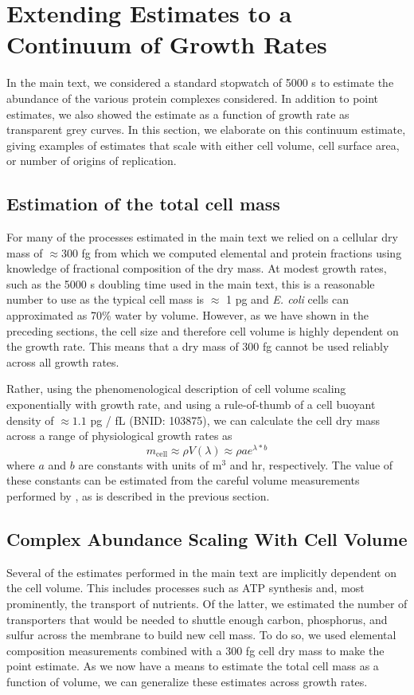 \section{Extending Estimates to a Continuum of Growth Rates}
In the main text, we considered a standard stopwatch of 5000 s to estimate the
abundance of the various protein complexes considered. In addition to point
estimates, we also showed the estimate as a function of growth rate as
transparent grey curves. In this section, we elaborate on this continuum
estimate, giving examples of estimates that scale with either cell volume, cell
surface area, or number of origins of replication.

\subsection{Estimation of the total cell mass}
For many of the processes estimated in the main text we relied on a cellular dry
mass of $\approx 300$ fg from which we computed elemental and protein fractions
using knowledge of fractional composition of the dry mass. At modest growth
rates, such as the 5000 s doubling time used in the main text, this is a
reasonable number to use as the typical cell mass is $\approx$ 1 pg and
\textit{E. coli} cells can approximated as 70\% water by volume. However, as we
have shown in the preceding sections, the cell size and therefore cell
volume is highly dependent on the growth rate. This means that a dry mass of 300
fg cannot be used reliably across all growth rates. 

Rather, using the phenomenological  description of cell volume scaling
exponentially with growth rate, and using a rule-of-thumb of a cell buoyant
density of $\approx 1.1$ pg / fL (BNID: 103875), we can calculate the cell dry mass across a
range of physiological growth rates as 
\begin{equation}
    m_\text{cell} \approx \rho V(\lambda) \approx \rho ae^{\lambda * b}
    \label{eq:def_mcell}
\end{equation}
where $a$ and $b$ are constants with units of \textmu m$^3$  and hr,
respectively. The value of these constants can be estimated from the careful
volume measurements performed by \cite{si2017}, as is described in the previous
section.

\subsection{Complex Abundance Scaling With Cell Volume}
Several of the estimates performed in the main text are implicitly dependent
on the cell volume. This includes processes such as ATP synthesis and, most
prominently, the transport of nutrients. Of the latter, we estimated the
number of transporters that would be needed to shuttle enough carbon,
phosphorus, and sulfur across the membrane to build new cell mass. To do so,
we used elemental composition measurements combined with a 300 fg cell dry
mass to make the point estimate. As we now have a means to estimate the total
cell mass as a function of volume, we can generalize these estimates across
growth rates.

